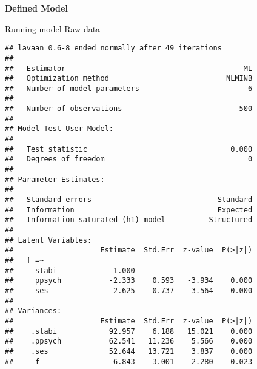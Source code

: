 \documentclass[
]{article}
\newenvironment{Shaded}{\begin{snugshade}}{\end{snugshade}}
\newcommand{\AttributeTok}[1]{\textcolor[rgb]{0.77,0.63,0.00}{#1}}
\newcommand{\CommentTok}[1]{\textcolor[rgb]{0.56,0.35,0.01}{\textit{#1}}}
\newcommand{\FunctionTok}[1]{\textcolor[rgb]{0.00,0.00,0.00}{#1}}
\newcommand{\NormalTok}[1]{#1}
\newcommand{\OtherTok}[1]{\textcolor[rgb]{0.56,0.35,0.01}{#1}}
\newcommand{\SpecialCharTok}[1]{\textcolor[rgb]{0.00,0.00,0.00}{#1}}
\newcommand{\StringTok}[1]{\textcolor[rgb]{0.31,0.60,0.02}{#1}}
\begin{document}
\textbf{Defined Model}

\begin{Shaded}
\end{Shaded}

Running model Raw data

\begin{Shaded}
\end{Shaded}

\begin{verbatim}
## lavaan 0.6-8 ended normally after 49 iterations
## 
##   Estimator                                         ML
##   Optimization method                           NLMINB
##   Number of model parameters                         6
##                                                       
##   Number of observations                           500
##                                                       
## Model Test User Model:
##                                                       
##   Test statistic                                 0.000
##   Degrees of freedom                                 0
## 
## Parameter Estimates:
## 
##   Standard errors                             Standard
##   Information                                 Expected
##   Information saturated (h1) model          Structured
## 
## Latent Variables:
##                    Estimate  Std.Err  z-value  P(>|z|)
##   f =~                                                
##     stabi             1.000                           
##     ppsych           -2.333    0.593   -3.934    0.000
##     ses               2.625    0.737    3.564    0.000
## 
## Variances:
##                    Estimate  Std.Err  z-value  P(>|z|)
##    .stabi            92.957    6.188   15.021    0.000
##    .ppsych           62.541   11.236    5.566    0.000
##    .ses              52.644   13.721    3.837    0.000
##     f                 6.843    3.001    2.280    0.023
\end{verbatim}
\end{document}
